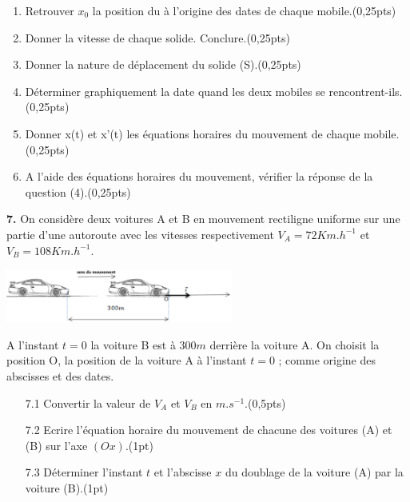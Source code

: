 \documentclass[12pt]{article}
\begin{document}
\begin{enumerate}


	\item Retrouver $x_0$ la position du à l'origine des dates de chaque mobile.\dotfill(0,25pts)

	\item Donner la vitesse de chaque solide. Conclure.\dotfill(0,25pts)
	\item Donner la nature de déplacement du solide (S).\dotfill(0,25pts)
	\item Déterminer graphiquement la date quand les deux mobiles se
rencontrent-ils.\dotfill(0,25pts)
\item Donner x(t) et x'(t) les équations horaires du mouvement de chaque
mobile.\dotfill(0,25pts)
\item A l'aide des équations horaires du mouvement, vérifier la réponse de la question (4).\dotfill(0,25pts)

\end{enumerate}
\textbf{7. } On considère deux voitures A et B en mouvement rectiligne uniforme sur une partie d’une autoroute avec les vitesses respectivement $V_A=72Km.h^{-1}$ et $V_B=108Km.h^{-1}$.
	\vspace{-0.3cm}
 \begin{center}
	\includegraphics[width=0.56\textwidth]{./img/ex1.png}
\end{center}


	\vspace{-0.4cm}
A l’instant $t=0$ la voiture B est à $300m$ derrière la voiture A.
On choisit la position O, la position de la voiture A à l’instant $t=0$ ; comme origine des abscisses et des dates.


\begin{enumerate}
	\item[7.1]  Convertir la valeur de $V_A$ et $V_B$ en $m.s^{-1}$.\dotfill(0,5pts)
	\item[7.2]  Ecrire l’équation horaire du mouvement de chacune des voitures (A) et (B) sur l’axe $(Ox)$.\dotfill(1pt)
	\item[7.3]  Déterminer l’instant $t$ et l’abscisse $x$ du doublage de la voiture (A) par la voiture (B).\dotfill(1pt)
\end{enumerate}
\end{document}
